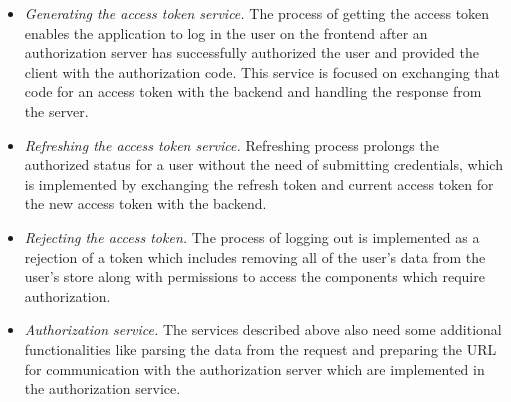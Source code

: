 \begin{itemize}
    \item \emph{Generating the access token service.} The process of getting the access token enables the application to log in the user on the frontend after an authorization server has successfully authorized the user and provided the client with the authorization code. This service is focused on exchanging that code for an access token with the backend and handling the response from the server.
    \item \emph{Refreshing the access token service.} Refreshing process prolongs the authorized status for a user without the need of submitting credentials, which is implemented by exchanging the refresh token and current access token for the new access token with the backend. 
    \item \emph{Rejecting the access token.} The process of logging out is implemented as a rejection of a token which includes removing all of the user's data from the user's store along with permissions to access the components which require authorization.
    \item \emph{Authorization service.} The services described above also need some additional functionalities like parsing the data from the request and preparing the URL for communication with the authorization server which are implemented in the authorization service. 
\end{itemize}




